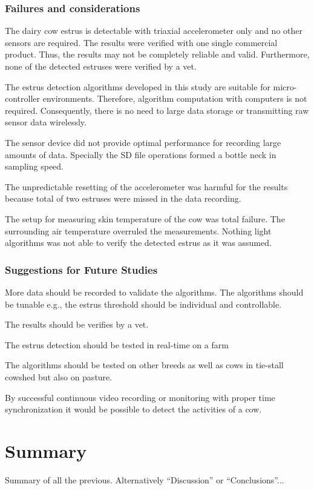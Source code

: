 \documentclass[english,12pt,a4paper,pdftex,elec,utf8]{aaltothesis}
\begin{document}
\subsubsection{Failures and considerations}

The dairy cow estrus is detectable with triaxial accelerometer only and no other sensors are required. The results were verified with one single commercial product. Thus, the results may not be completely reliable and valid. Furthermore, none of the detected estruses were verified by a vet.

The estrus detection algorithms developed in this study are suitable for micro-controller environments. Therefore, algorithm computation with computers is not required. Consequently, there is no need to large data storage or transmitting raw sensor data wirelessly.

The sensor device did not provide optimal performance for recording large amounts of data. Specially the SD file operations formed a bottle neck in sampling speed.

The unpredictable resetting of the accelerometer was harmful for the results because total of two estruses were missed in the data recording.

The setup for measuring skin temperature of the cow was total failure. The surrounding air temperature overruled the measurements. Nothing light algorithms was not able to verify the detected estrus as it was assumed.

\subsubsection{Suggestions for Future Studies}

More data should be recorded to validate the algorithms. The algorithms should be tunable e.g., the estrus threshold should be individual and controllable.

The results should be verifies by a vet.

The estrus detection should be tested in real-time on a farm

The algorithms should be tested on other breeds as well as cows in tie-stall cowshed but also on pasture.

By successful continuous video recording or monitoring with proper time synchronization it would be possible to detect the activities of a cow. 


\clearpage

\section{Summary} \label{summarysection}


Summary of all the previous. Alternatively ``Discussion'' or ``Conclusions''...


\clearpage

\thesisbibliography

%



\printbibliography




\clearpage

\thesisappendix


\end{document}
